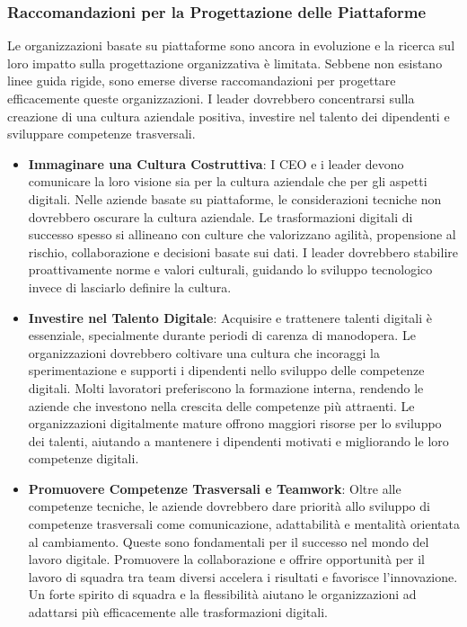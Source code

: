 \documentclass{article}
\begin{document}
\subsubsection{Raccomandazioni per la Progettazione delle Piattaforme}

Le organizzazioni basate su piattaforme sono ancora in evoluzione e la ricerca sul loro impatto sulla progettazione organizzativa è limitata. Sebbene non esistano linee guida rigide, sono emerse diverse raccomandazioni per progettare efficacemente queste organizzazioni. I leader dovrebbero concentrarsi sulla creazione di una cultura aziendale positiva, investire nel talento dei dipendenti e sviluppare competenze trasversali.

\begin{itemize}
    \item \textbf{Immaginare una Cultura Costruttiva}: I CEO e i leader devono comunicare la loro visione sia per la cultura aziendale che per gli aspetti digitali. Nelle aziende basate su piattaforme, le considerazioni tecniche non dovrebbero oscurare la cultura aziendale. Le trasformazioni digitali di successo spesso si allineano con culture che valorizzano agilità, propensione al rischio, collaborazione e decisioni basate sui dati. I leader dovrebbero stabilire proattivamente norme e valori culturali, guidando lo sviluppo tecnologico invece di lasciarlo definire la cultura.
    
    \item \textbf{Investire nel Talento Digitale}: Acquisire e trattenere talenti digitali è essenziale, specialmente durante periodi di carenza di manodopera. Le organizzazioni dovrebbero coltivare una cultura che incoraggi la sperimentazione e supporti i dipendenti nello sviluppo delle competenze digitali. Molti lavoratori preferiscono la formazione interna, rendendo le aziende che investono nella crescita delle competenze più attraenti. Le organizzazioni digitalmente mature offrono maggiori risorse per lo sviluppo dei talenti, aiutando a mantenere i dipendenti motivati e migliorando le loro competenze digitali.
    
    \item \textbf{Promuovere Competenze Trasversali e Teamwork}: Oltre alle competenze tecniche, le aziende dovrebbero dare priorità allo sviluppo di competenze trasversali come comunicazione, adattabilità e mentalità orientata al cambiamento. Queste sono fondamentali per il successo nel mondo del lavoro digitale. Promuovere la collaborazione e offrire opportunità per il lavoro di squadra tra team diversi accelera i risultati e favorisce l'innovazione. Un forte spirito di squadra e la flessibilità aiutano le organizzazioni ad adattarsi più efficacemente alle trasformazioni digitali.
\end{itemize}
\end{document}
